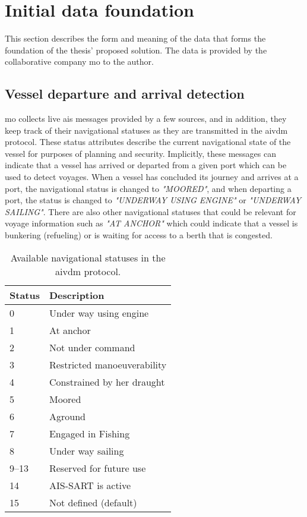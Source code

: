 \section{Initial data foundation}
\label{sec:initial_data_foundation}

This section describes the form and meaning of the data that forms the foundation of the thesis' proposed solution. The data is provided by the collaborative company \acrfull{mo} to the author.

\subsection{Vessel departure and arrival detection}
\label{sec:vessel_transitions}

\acrshort{mo} collects live \acrshort{ais} messages provided by a few sources, and in addition, they keep track of their navigational statuses as they are transmitted in the \gls{aivdm} protocol. These status attributes describe the current navigational state of the vessel for purposes of planning and security. Implicitly, these messages can indicate that a vessel has arrived or departed from a given port which can be used to detect voyages. When a vessel has concluded its journey and arrives at a port, the navigational status is changed to \textit{"MOORED"}, and when departing a port, the status is changed to \textit{"UNDERWAY USING ENGINE"} or \textit{"UNDERWAY SAILING"}. There are also other navigational statuses that could be relevant for voyage information such as \textit{"AT ANCHOR"} which could indicate that a vessel is bunkering (refueling) or is waiting for access to a berth that is congested.

\begin{table}
    \centering
    \small{\begin{tabular}{l l}
    \toprule
        \textbf{Status} & \textbf{Description} \\ \midrule
        0 & Under way using engine \\ \midrule
        1 & At anchor \\ \midrule
        2 & Not under command \\ \midrule
        3 & Restricted manoeuverability \\ \midrule
        4 & Constrained by her draught \\ \midrule
        5 & Moored \\ \midrule
        6 & Aground \\ \midrule
        7 & Engaged in Fishing \\ \midrule
        8 & Under way sailing \\ \midrule
        9--13 & Reserved for future use \\ \midrule
        14 & AIS-SART is active \\ \midrule
        15 & Not defined (default) \\ \bottomrule
    \end{tabular}}
    \caption{Available navigational statuses in the \gls{aivdm} protocol.}\label{tab:nav_stats}
\end{table}

